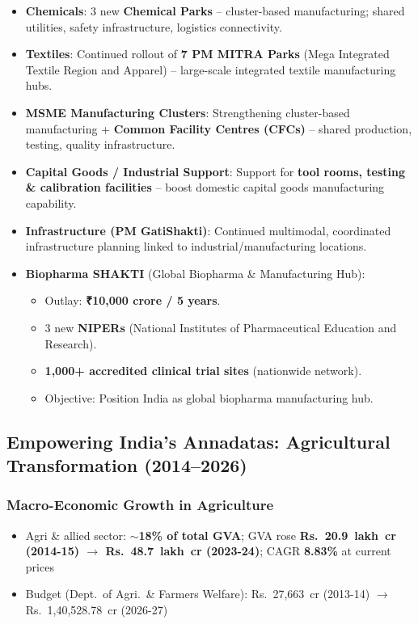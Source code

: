 \begin{itemize}

  \item \textbf{Chemicals}: 3 new \textbf{Chemical Parks} -- cluster-based manufacturing; shared utilities, safety infrastructure, logistics connectivity.

  \item \textbf{Textiles}: Continued rollout of \textbf{7 PM MITRA Parks} (Mega Integrated Textile Region and Apparel) -- large-scale integrated textile manufacturing hubs.

  \item \textbf{MSME Manufacturing Clusters}: Strengthening cluster-based manufacturing + \textbf{Common Facility Centres (CFCs)} -- shared production, testing, quality infrastructure.

  \item \textbf{Capital Goods / Industrial Support}: Support for \textbf{tool rooms, testing \& calibration facilities} -- boost domestic capital goods manufacturing capability.

  \item \textbf{Infrastructure (PM GatiShakti)}: Continued multimodal, coordinated infrastructure planning linked to industrial/manufacturing locations.

  \item \textbf{Biopharma SHAKTI} (Global Biopharma \& Manufacturing Hub):
    \begin{itemize}
      \item Outlay: \textbf{₹10,000 crore / 5 years}.
      \item 3 new \textbf{NIPERs} (National Institutes of Pharmaceutical Education and Research).
      \item \textbf{1,000+ accredited clinical trial sites} (nationwide network).
      \item Objective: Position India as global biopharma manufacturing hub.
    \end{itemize}

\end{itemize}

\subsection{Empowering India's Annadatas: Agricultural Transformation (2014--2026)}

\subsubsection*{Macro-Economic Growth in Agriculture}
\begin{itemize}
  \item Agri \& allied sector: $\sim$\textbf{18\% of total GVA}; GVA rose \textbf{Rs.~20.9~lakh~cr (2014-15) $\to$ Rs.~48.7~lakh~cr (2023-24)}; CAGR \textbf{8.83\%} at current prices
  \item Budget (Dept.\ of Agri.\ \& Farmers Welfare): Rs.~27,663~cr (2013-14) $\to$ Rs.~1,40,528.78~cr (2026-27)
\end{itemize}

